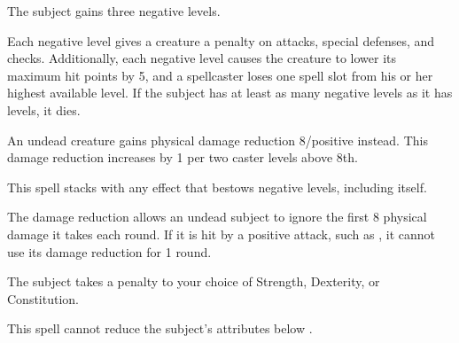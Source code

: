 \spellrng{\rngclose}
\spelldur{\durshort}
\begin{spelleffect}
  The subject gains three negative levels.
  \par Each negative level gives a creature a  penalty on attacks, special defenses, and checks. Additionally, each negative level causes the creature to lower its maximum hit points by 5, and a spellcaster loses one spell slot from his or her highest available level. If the subject has at least as many negative levels as it has levels, it dies.
  \par An undead creature gains physical damage reduction 8/positive instead. This damage reduction increases by 1 per two caster levels above 8th.
\end{spelleffect}
\begin{spellnotes}
  This spell stacks with any effect that bestows negative levels, including itself.

  The damage reduction allows an undead subject to ignore the first 8 physical damage it takes each round. If it is hit by a positive attack, such as , it cannot use its damage reduction for 1 round.
\end{spellnotes}

\spellrng{\rngmed}
\spelldur{\durshort}
\begin{spelleffect}
  The subject takes a  penalty to your choice of Strength, Dexterity, or Constitution.
\end{spelleffect}
\begin{spellnotes}
  This spell cannot reduce the subject's attributes below .
\end{spellnotes}

